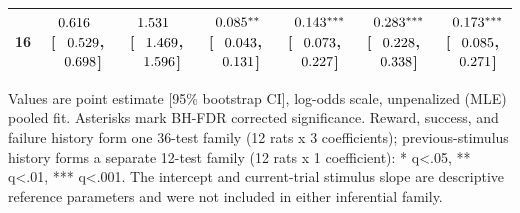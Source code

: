 \begin{table}[htbp]
{\begin{tabular}{lcccccc}
16 & $\hphantom{-}0.616^{\hphantom{***}}$ [$\hphantom{-}0.529$, $\hphantom{-}0.698$] & $\hphantom{-}1.531^{\hphantom{***}}$ [$\hphantom{-}1.469$, $\hphantom{-}1.596$] & $\hphantom{-}0.085^{**\hphantom{*}}$ [$\hphantom{-}0.043$, $\hphantom{-}0.131$] & $\hphantom{-}0.143^{***}$ [$\hphantom{-}0.073$, $\hphantom{-}0.227$] & $\hphantom{-}0.283^{***}$ [$\hphantom{-}0.228$, $\hphantom{-}0.338$] & $\hphantom{-}0.173^{***}$ [$\hphantom{-}0.085$, $\hphantom{-}0.271$] \\
\bottomrule
\end{tabular}
}
\vspace{4pt}
\par\noindent
\begin{minipage}{\linewidth}\small Values are point estimate [95\% bootstrap CI], log-odds scale, unpenalized (MLE) pooled fit. Asterisks mark BH-FDR corrected significance. Reward, success, and failure history form one 36-test family (12 rats x 3 coefficients); previous-stimulus history forms a separate 12-test family (12 rats x 1 coefficient): * q<.05, ** q<.01, *** q<.001. The intercept and current-trial stimulus slope are descriptive reference parameters and were not included in either inferential family.\end{minipage}
\end{table}